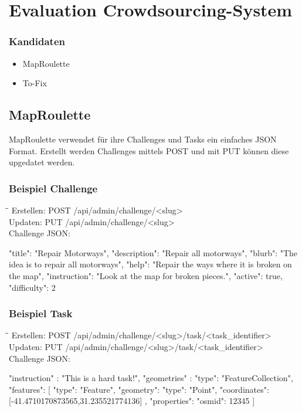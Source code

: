 \newpage
\section{Evaluation Crowdsourcing-System}
\label{sec:crowdsourcing}
\subsubsection{Kandidaten}
\begin{itemize}
	\item MapRoulette \cite{MapRoulette}
	\item To-Fix \cite{To-Fix}
\end{itemize}

\subsection{MapRoulette}
\label{subsec:MapRoulette}
\Gls{MapRoulette} verwendet für ihre Challenges und Tasks ein einfaches JSON Format. Erstellt werden Challenges mittels POST und mit PUT können diese upgedatet werden.

\subsubsection{Beispiel Challenge}
\begin{tabbing}
    \hspace*{4cm}\=\hspace*{5cm}\= \kill
    Erstellen: \> POST /api/admin/challenge/<slug>  \\
    Updaten: \> PUT /api/admin/challenge/<slug> \\
    Challenge JSON: \\
\end{tabbing}		
\begin{python}
{
  "title": "Repair Motorways",
  "description": "Repair all motorways",
  "blurb": "The idea is to repair all motorways",
  "help": "Repair the ways where it is broken on the map",
  "instruction": "Look at the map for broken pieces.",
  "active": true,
  "difficulty": 2
}
\end{python}
\newpage
\subsubsection{Beispiel Task}
\begin{tabbing}
    \hspace*{4cm}\=\hspace*{5cm}\= \kill
    Erstellen: \> POST /api/admin/challenge/<slug>/task/<task\_identifier> \\
    Updaten: \> PUT /api/admin/challenge/<slug>/task/<task\_identifier> \\
    Challenge JSON: \\
\end{tabbing}
\begin{python}
{ 
  "instruction" : "This is a hard task!",
  "geometries" : {
    "type": "FeatureCollection",
    "features": [
      { "type": "Feature",
        "geometry": 
        { "type": "Point", 
          "coordinates":[-41.4710170873565,31.235521774136]
        },
        "properties": {"osmid": 12345}
      }
    ]
  }
}
\end{python}	

